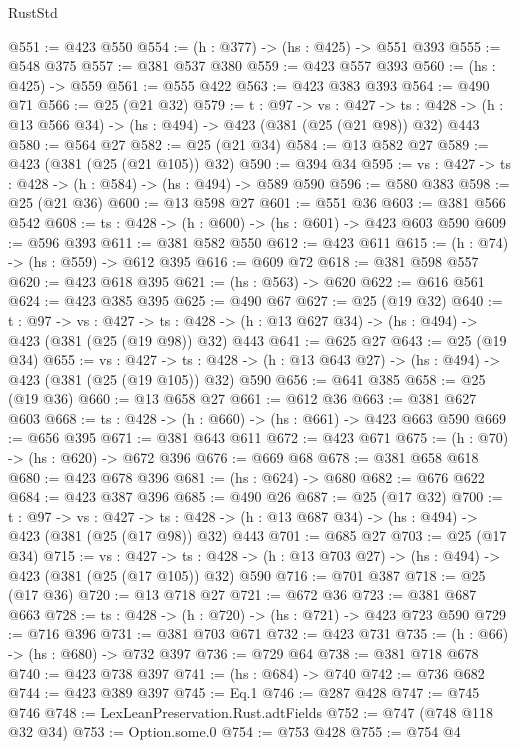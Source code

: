\begin{lexlean}{RustStd}
\begin{coremodule}
@551 := @423 @550
@554 := (h : @377) -> (hs : @425) -> @551 @393
@555 := @548 @375
@557 := @381 @537 @380
@559 := @423 @557 @393
@560 := (hs : @425) -> @559
@561 := @555 @422
@563 := @423 @383 @393
@564 := @490 @71
@566 := @25 (@21 @32)
@579 := {t : @97} ->
  {vs : @427} ->
  {ts : @428} -> (h : @13 @566 @34) -> (hs : @494) -> @423 (@381 (@25 (@21 @98)) @32) @443
@580 := @564 @27
@582 := @25 (@21 @34)
@584 := @13 @582 @27
@589 := @423 (@381 (@25 (@21 @105)) @32)
@590 := @394 @34
@595 := {vs : @427} -> {ts : @428} -> (h : @584) -> (hs : @494) -> @589 @590
@596 := @580 @383
@598 := @25 (@21 @36)
@600 := @13 @598 @27
@601 := @551 @36
@603 := @381 @566 @542
@608 := {ts : @428} -> (h : @600) -> (hs : @601) -> @423 @603 @590
@609 := @596 @393
@611 := @381 @582 @550
@612 := @423 @611
@615 := (h : @74) -> (hs : @559) -> @612 @395
@616 := @609 @72
@618 := @381 @598 @557
@620 := @423 @618 @395
@621 := (hs : @563) -> @620
@622 := @616 @561
@624 := @423 @385 @395
@625 := @490 @67
@627 := @25 (@19 @32)
@640 := {t : @97} ->
  {vs : @427} ->
  {ts : @428} -> (h : @13 @627 @34) -> (hs : @494) -> @423 (@381 (@25 (@19 @98)) @32) @443
@641 := @625 @27
@643 := @25 (@19 @34)
@655 := {vs : @427} ->
  {ts : @428} -> (h : @13 @643 @27) -> (hs : @494) -> @423 (@381 (@25 (@19 @105)) @32) @590
@656 := @641 @385
@658 := @25 (@19 @36)
@660 := @13 @658 @27
@661 := @612 @36
@663 := @381 @627 @603
@668 := {ts : @428} -> (h : @660) -> (hs : @661) -> @423 @663 @590
@669 := @656 @395
@671 := @381 @643 @611
@672 := @423 @671
@675 := (h : @70) -> (hs : @620) -> @672 @396
@676 := @669 @68
@678 := @381 @658 @618
@680 := @423 @678 @396
@681 := (hs : @624) -> @680
@682 := @676 @622
@684 := @423 @387 @396
@685 := @490 @26
@687 := @25 (@17 @32)
@700 := {t : @97} ->
  {vs : @427} ->
  {ts : @428} -> (h : @13 @687 @34) -> (hs : @494) -> @423 (@381 (@25 (@17 @98)) @32) @443
@701 := @685 @27
@703 := @25 (@17 @34)
@715 := {vs : @427} ->
  {ts : @428} -> (h : @13 @703 @27) -> (hs : @494) -> @423 (@381 (@25 (@17 @105)) @32) @590
@716 := @701 @387
@718 := @25 (@17 @36)
@720 := @13 @718 @27
@721 := @672 @36
@723 := @381 @687 @663
@728 := {ts : @428} -> (h : @720) -> (hs : @721) -> @423 @723 @590
@729 := @716 @396
@731 := @381 @703 @671
@732 := @423 @731
@735 := (h : @66) -> (hs : @680) -> @732 @397
@736 := @729 @64
@738 := @381 @718 @678
@740 := @423 @738 @397
@741 := (hs : @684) -> @740
@742 := @736 @682
@744 := @423 @389 @397
@745 := Eq.{1}
@746 := @287 @428
@747 := @745 @746
@748 := LexLeanPreservation.Rust.adtFields
@752 := @747 (@748 @118 @32 @34)
@753 := Option.some.{0}
@754 := @753 @428
@755 := @754 @4

\end{coremodule}
\end{lexlean}
